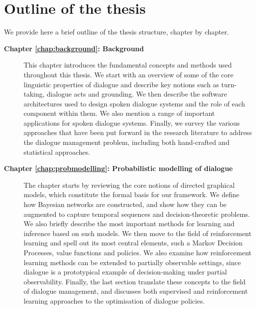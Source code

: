 
\section{Outline of the thesis}

We provide here a brief outline of the thesis structure, chapter by chapter. 

\begin{description}
  \item[\textbf{Chapter \ref{chap:background}: Background}] \hfill  \vspace{2mm}
  
This chapter introduces the fundamental concepts and methods used throughout this thesis. We start with an overview of some of the core linguistic properties of dialogue and describe key notions such as turn-taking, dialogue acts and grounding.  We then describe the software architectures used to design spoken dialogue systems and the role of each component within them.  We also mention a range of important applications for spoken dialogue systems. Finally, we survey the various approaches that have been put forward in the research literature to address the dialogue management problem, including both hand-crafted and statistical approaches. \vspace{2mm}

  \item[\textbf{Chapter \ref{chap:probmodelling}: Probabilistic modelling of dialogue}] \hfill \vspace{2mm}

 The chapter starts by reviewing the core notions of directed graphical models, which constitute the formal basis for our framework.  We define how Bayesian networks are constructed, and show how they can be augmented to capture temporal sequences and decision-theoretic problems. We also briefly describe the most important methods for learning and inference based on such models.  We then  move to the field of reinforcement learning and spell out its most central elements, such a  Markov Decision Processes, value functions and policies. We also examine how reinforcement learning methods can be extended to partially observable settings, since dialogue is a prototypical example of decision-making under partial observability.  Finally, the last section translate these concepts to the field of dialogue management, and discusses both supervised and reinforcement learning approaches to the optimisation of dialogue policies.
 

\end{description}

